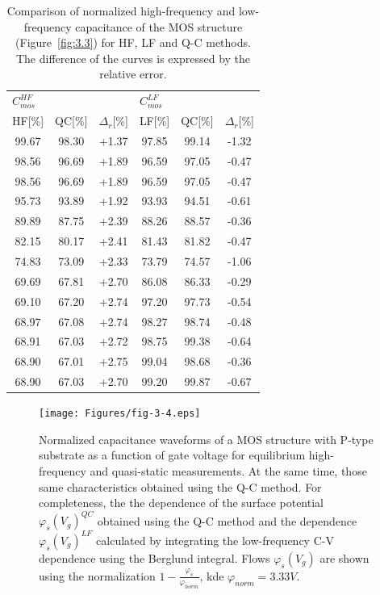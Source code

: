 \begin{table}[h!]\centering
  \begin{tabular}{c c c c c c}
    \multicolumn{3}{l}{$C^{HF}_{mos}$} & \multicolumn{3}{l}{$C^{LF}_{mos}$} \\
    HF[\%] & QC[\%] & $\Delta_r$[\%] & LF[\%] & QC[\%] & $\Delta_r$[\%] \\
    \hline%
    99.67 & 98.30 & +1.37 & 97.85 & 99.14 & -1.32 \\
    98.56 & 96.69 & +1.89 & 96.59 & 97.05 & -0.47 \\
    98.56 & 96.69 & +1.89 & 96.59 & 97.05 & -0.47 \\
    95.73 & 93.89 & +1.92 & 93.93 & 94.51 & -0.61 \\
    89.89 & 87.75 & +2.39 & 88.26 & 88.57 & -0.36 \\
    82.15 & 80.17 & +2.41 & 81.43 & 81.82 & -0.47 \\
    74.83 & 73.09 & +2.33 & 73.79 & 74.57 & -1.06 \\
    69.69 & 67.81 & +2.70 & 86.08 & 86.33 & -0.29 \\
    69.10 & 67.20 & +2.74 & 97.20 & 97.73 & -0.54 \\
    68.97 & 67.08 & +2.74 & 98.27 & 98.74 & -0.48 \\
    68.91 & 67.03 & +2.72 & 98.75 & 99.38 & -0.64 \\
    68.90 & 67.01 & +2.75 & 99.04 & 98.68 & -0.36 \\
    68.90 & 67.03 & +2.70 & 99.20 & 99.87 & -0.67 \\
  \end{tabular}
  \caption[Comparison of normalized frequency and low-frequency
    capacitance of the MOS structure (Figure~\ref{fig:3.3}) for HF, LF
    and Q-C methods]{Comparison of normalized high-frequency and
    low-frequency capacitance of the MOS structure
    (Figure~\ref{fig:3.3}) for HF, LF and Q-C methods. The difference
    of the curves is expressed by the relative error.}\label{tab:3.1}
\end{table}

\newpage
\begin{figure}[h!]\centering
\texttt{[image: Figures/fig-3-4.eps]}
\captionsetup{justification=raggedright, singlelinecheck=false}
\caption[Normalized capacitance waveforms of MOS structure with substrate type
  P as a function of gate voltage for equilibrium high-frequency and
  quasi-static measurements]{Normalized capacitance waveforms of a MOS structure with
  P-type substrate as a function of gate voltage for equilibrium
  high-frequency and quasi-static measurements.  At the same time, those
  same characteristics obtained using the Q-C method. For completeness, the
  the dependence of the surface potential
  ${\varphi_s(V_g)}^{QC}$ obtained using the Q-C method and the dependence
  ${\varphi_s(V_g)}^{LF}$ calculated by integrating the low-frequency C-V
  dependence using the Berglund integral. Flows
  $\varphi_s(V_g)$ are shown using the normalization $1 -
  \frac{\varphi_s}{\varphi_{norm}}$, kde $\varphi_{norm}=3.33V$.}\label{fig:3.4}
\end{figure}

